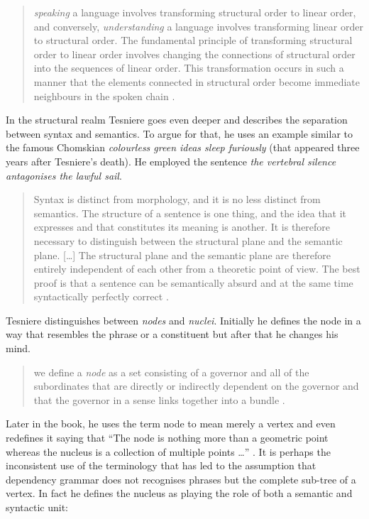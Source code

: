     \begin{quotation}
        \textit{speaking} a language involves transforming structural order to linear order, and conversely, \textit{understanding} a language involves transforming linear order to structural order. The fundamental principle of transforming structural order to linear order involves changing the connections of structural order into the sequences of linear order. This transformation occurs in such a manner that the elements connected in structural order become immediate neighbours in the spoken chain \citep[12]{Tesniere2015}.
    \end{quotation}

    In the structural realm Tesniere goes even deeper and describes the separation between syntax and semantics. To argue for that, he uses an example similar to the famous Chomskian \textit{colourless green ideas sleep furiously} \citep{Chomsky57} (that appeared three years after Tesniere's death). He employed the sentence \textit{the vertebral silence antagonises the lawful sail}.
    
    \begin{quotation}
        Syntax is distinct from morphology, and it is no less distinct from semantics. The structure of a sentence is one thing, and the idea that it expresses and that constitutes its meaning is another. It is therefore necessary to distinguish between the structural plane and the semantic plane.
        [\dots]
        The structural plane and the semantic plane are therefore entirely independent of each other from a theoretic point of view. The best proof is that a sentence can be ­semantically absurd and at the same time syntactically perfectly correct \citep[33]{Tesniere2015}.
    \end{quotation}

    Tesniere distinguishes between \textit{nodes} and \textit{nuclei}. Initially he defines the node in a way that resembles the phrase or a constituent but after that he changes his mind.  
    
    \begin{quotation}
        we define a \textit{node} as a set consisting of a governor and all of the subordinates that are directly or indirectly dependent on the governor and that the governor in a sense links together into a bundle \citep[6]{Tesniere2015}.
    \end{quotation}

    Later in the book, he uses the term node to mean merely a vertex and even redefines it saying that ``The node is nothing more than a geometric point whereas the nucleus is a collection of multiple points \dots'' \cite[39]{Tesniere2015}. It is perhaps the inconsistent use of the terminology that has led to the assumption that dependency grammar does not recognises phrases but the complete sub-tree of a vertex. In fact he defines the nucleus as playing the role of both a semantic and syntactic unit:

